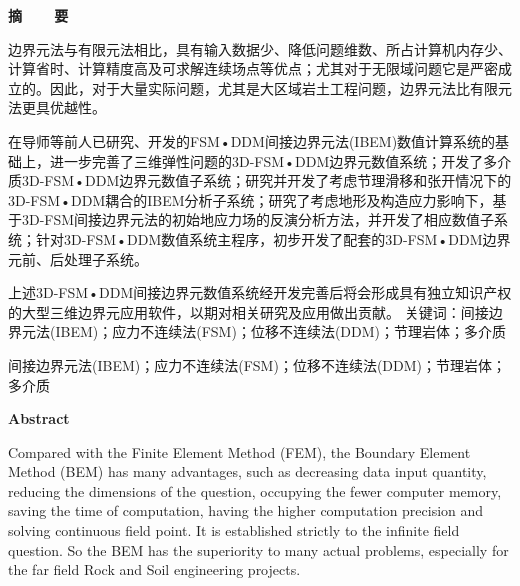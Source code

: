 
\newpage\thispagestyle{empty}
\begin{center}{\bfseries\hei\fontsize{18pt}{18pt}\selectfont\setlength{\parskip}{0.5\baselineskip} {摘~~~~要}}\end{center} %

边界元法与有限元法相比，具有输入数据少、降低问题维数、所占计算机内存少、计算省时、计算精度高及可求解连续场点等优点；尤其对于无限域问题它是严密成立的。因此，对于大量实际问题，尤其是大区域岩土工程问题，边界元法比有限元法更具优越性。

在导师等前人已研究、开发的FSM•DDM间接边界元法(IBEM)数值计算系统的基础上，进一步完善了三维弹性问题的3D-FSM•DDM边界元数值系统；开发了多介质3D-FSM•DDM边界元数值子系统；研究并开发了考虑节理滑移和张开情况下的3D-FSM•DDM耦合的IBEM分析子系统；研究了考虑地形及构造应力影响下，基于3D-FSM间接边界元法的初始地应力场的反演分析方法，并开发了相应数值子系统；针对3D-FSM•DDM数值系统主程序，初步开发了配套的3D-FSM•DDM边界元前、后处理子系统。

上述3D-FSM•DDM间接边界元数值系统经开发完善后将会形成具有独立知识产权的大型三维边界元应用软件，以期对相关研究及应用做出贡献。
关键词：间接边界元法(IBEM)；应力不连续法(FSM)；位移不连续法(DDM)；节理岩体；多介质

{\bfseries\xiaosi{}}间接边界元法(IBEM)；应力不连续法(FSM)；位移不连续法(DDM)；节理岩体；多介质


\clearpage

\newpage\thispagestyle{empty}
\begin{center}{\bfseries\fontsize{18pt}{18pt}\selectfont\setlength{\parskip}{0.5\baselineskip} {Abstract}}\end{center}

Compared with the Finite Element Method (FEM), the Boundary Element Method (BEM) has many advantages, such as decreasing data input quantity, reducing the dimensions of the question, occupying the fewer computer memory, saving the time of computation, having the higher computation precision and solving continuous field point. It is established strictly to the infinite field question. So the BEM has the superiority to many actual problems, especially for the far field Rock and Soil engineering projects.

